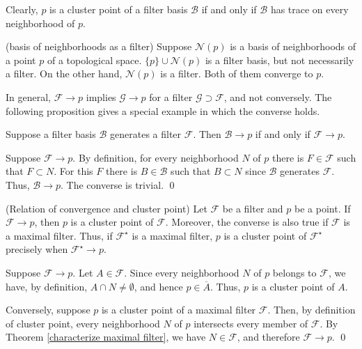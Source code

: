 \documentclass{report}
\begin{document}
\begin{rem}
    Clearly, \( p \) is a cluster point of a filter basis \( \mathscr{B} \) if and only if \( \mathscr{B} \) has trace on every neighborhood of \( p \).
\end{rem}

\begin{ex}\label{example local basis} (basis of neighborhoods as a filter)
    Suppose \( \mathscr{N}(p) \) is a basis of neighborhoods of a point \( p \) of a topological space.
    \( \{p\} \cup \mathscr{N}(p) \) is a filter basis, but not necessarily a filter. On the other hand, \( \mathscr{N}(p) \) is a filter. Both of them converge to \( p \).
\end{ex}

In general, \( \mathscr{F}\to p \) implies \( \mathscr{G}\to p \) for a filter \( \mathscr{G} \supset \mathscr{F} \), and not conversely. The following proposition gives a special example in which the converse holds.
\begin{prp}
    Suppose a filter basis \( \mathscr{B} \) generates a filter \( \mathscr{F} \). Then \( \mathscr{B}\to p \) if and only if \( \mathscr{F}\to p \).
\end{prp}
\begin{prf}
    Suppose \( \mathscr{F}\to p \). By definition, for every neighborhood \( N \) of \( p \) there is \( F \in \mathscr{F} \) such that \( F \subset N \). For this \( F \) there is \( B \in \mathscr{B} \) such that \( B \subset N \) since \( \mathscr{B} \) generates \( \mathscr{F} \). Thus, \( \mathscr{B}\to p \). The converse is trivial.
    \qed\end{prf}


\begin{lem}\label{Relation of convergence and cluster point} (Relation of convergence and cluster point)
    Let \( \mathscr{F} \) be a filter and \( p \) be a point.
    If \( \mathscr{F}\to p \), then \( p \) is a cluster point of \( \mathscr{F} \).
    Moreover, the converse is also true if \( \mathscr{F} \) is a maximal filter.
    Thus, if \( \mathscr{F}^{\star} \) is a maximal filter, \( p \) is a cluster point of \( \mathscr{F}^{\star} \) precisely when \( \mathscr{F}^{\star} \to p\).
\end{lem}
\begin{prf}
    Suppose \( \mathscr{F} \to p \). Let \( A \in \mathscr{F} \).
    Since every neighborhood \( N \) of \( p \) belongs to \( \mathscr{F} \), we have, by definition, \( A \cap N \neq \emptyset \), and hence \( p \in \overline{A} \). Thus, \( p \) is a cluster point of \( A \).

    Conversely, suppose \( p \) is a cluster point of a maximal filter \( \mathscr{F} \). Then, by definition of cluster point, every neighborhood \( N \) of \( p \) intersects every member of \( \mathscr{F} \). By Theorem \ref{characterize maximal filter}, we have \( N \in \mathscr{F} \), and therefore \( \mathscr{F} \to p \).
    \qed\end{prf}
\end{document}
